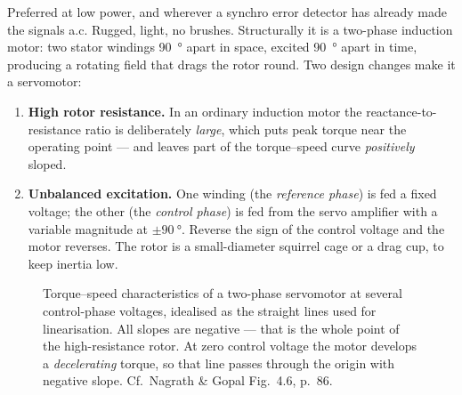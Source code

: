 \documentclass[11pt,a4paper]{article}
\begin{document}
Preferred at low power, and wherever a synchro error detector has already made
the signals a.c. Rugged, light, no brushes. Structurally it is a two-phase
induction motor: two stator windings \SI{90}{\degree} apart in space, excited
\SI{90}{\degree} apart in time, producing a rotating field that drags the rotor
round. Two design changes make it a servomotor:

\begin{enumerate}[leftmargin=*]
\item \textbf{High rotor resistance.} In an ordinary induction motor the
      reactance-to-resistance ratio is deliberately \emph{large}, which puts
      peak torque near the operating point --- and leaves part of the
      torque--speed curve \emph{positively} sloped.
\item \textbf{Unbalanced excitation.} One winding (the \emph{reference phase})
      is fed a fixed voltage; the other (the \emph{control phase}) is fed from
      the servo amplifier with a variable magnitude at
      $\pm\SI{90}{\degree}$. Reverse the sign of the control voltage and the
      motor reverses. The rotor is a small-diameter squirrel cage or a drag cup,
      to keep inertia low.
\end{enumerate}

\begin{figure}[H]
\centering
{}
\caption{Torque--speed characteristics of a two-phase servomotor at several
control-phase voltages, idealised as the straight lines used for linearisation.
All slopes are negative --- that is the whole point of the high-resistance
rotor. At zero control voltage the motor develops a \emph{decelerating} torque,
so that line passes through the origin with negative slope. Cf.\ Nagrath \&
Gopal Fig.~4.6, p.~86.}
\label{fig:acservo}
\end{figure}
\end{document}

